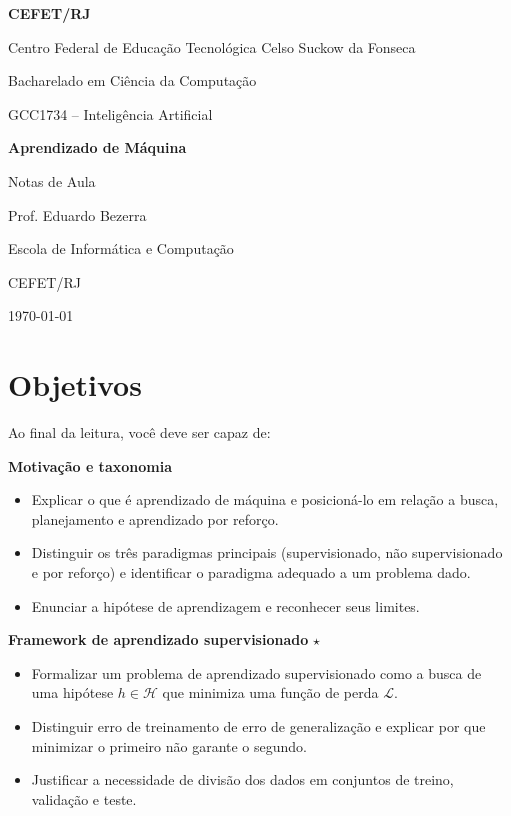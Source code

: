 \documentclass[12pt,a4paper]{article}
\title{}
\author{}
\date{}
\begin{document}
\begin{titlepage}
\centering
\vspace*{1.8cm}
{\Large\bfseries CEFET/RJ\par}
\vspace{0.3cm}
{\large Centro Federal de Educação Tecnológica Celso Suckow da Fonseca\par}
\vspace{1.8cm}
{\large Bacharelado em Ciência da Computação\par}
\vspace{0.4cm}
{\large GCC1734 -- Inteligência Artificial\par}
\vfill
{\Huge\bfseries Aprendizado de Máquina\par}
\vspace{0.5cm}
{\LARGE Notas de Aula\par}
\vfill
{\large Prof. Eduardo Bezerra\par}
\vspace{0.2cm}
{\large Escola de Informática e Computação\par}
\vspace{0.2cm}
{\large CEFET/RJ\par}
\vfill
{\large \today\par}
\end{titlepage}

\thispagestyle{empty}
\tableofcontents
\newpage

\section*{Objetivos}

Ao final da leitura, você deve ser capaz de:

\medskip
\noindent\textbf{Motivação e taxonomia}
\begin{itemize}
    \item Explicar o que é aprendizado de máquina e posicioná-lo em relação a busca, planejamento e aprendizado por reforço.
    \item Distinguir os três paradigmas principais (supervisionado, não supervisionado e por reforço) e identificar o paradigma adequado a um problema dado.
    \item Enunciar a hipótese de aprendizagem e reconhecer seus limites.
\end{itemize}

\noindent\textbf{Framework de aprendizado supervisionado} $\star$
\begin{itemize}
    \item Formalizar um problema de aprendizado supervisionado como a busca de uma hipótese $h \in \mathcal{H}$ que minimiza uma função de perda $\mathcal{L}$.
    \item Distinguir erro de treinamento de erro de generalização e explicar por que minimizar o primeiro não garante o segundo.
    \item Justificar a necessidade de divisão dos dados em conjuntos de treino, validação e teste.
\end{itemize}
\end{document}

